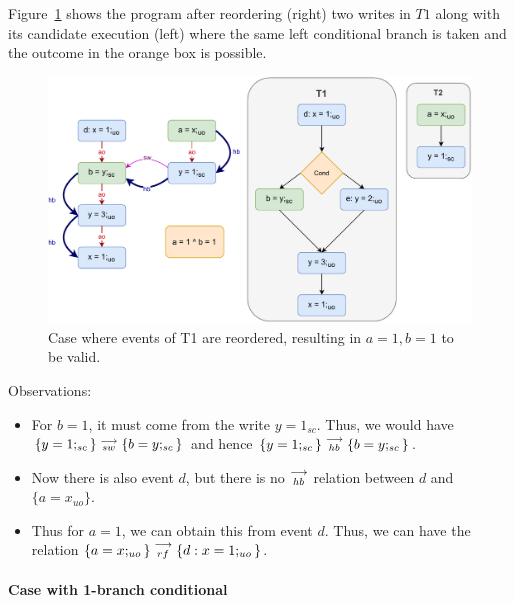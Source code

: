     Figure~\ref{reord:cond_counter_example1(b)} shows the program after reordering (right) two writes in $T1$ along with its candidate execution (left) where the same left conditional branch is taken and the outcome in the orange box is possible. 
    \begin{figure}[H]
        \centering 
        \includegraphics[scale=0.7]{7.CounterExamples/ReorderingConditionals/CounterExamples1b(Conditionals).pdf}
        \caption{Case where events of T1 are reordered, resulting in $a = 1,  b = 1$ to be valid.}
        \label{reord:cond_counter_example1(b)}
    \end{figure}
    
    Observations:
    \begin{itemize}
        \item For $b=1$, it must come from the write $y=1_{sc}$. 
        Thus, we would have $\{y=1;_{sc}\}\stackrel{\longrightarrow}{_{sw}}\{b=y;_{sc}\}$ and hence $\{y=1;_{sc}\}\stackrel{\longrightarrow}{_{hb}}\{b=y;_{sc}\}$.
        \item Now there is also event $d$, but there is no $\stackrel{\longrightarrow}{_{hb}}$ relation between $d$ and $\{a=x_{uo}\}$.
        \item Thus for $a=1$, we can obtain this from event $d$. Thus, we can have the relation $\{a=x;_{uo}\}\stackrel{\longrightarrow}{_{rf}}\{d: x=1;_{uo}\}$.
    \end{itemize}
    
    \paragraph{Case with 1-branch conditional}

